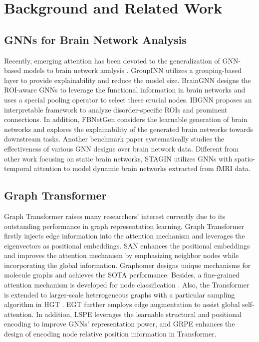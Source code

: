 \section{Background and Related Work}

\subsection{GNNs for Brain Network Analysis}
Recently, emerging attention has been devoted to the generalization of GNN-based models to brain network analysis \citep{DBLP:conf/miccai/LiDZZVD19, ahmedt2021graph}. GroupINN \citep{groupinn2019} utilizes a grouping-based layer to provide explainability and reduce the model size. BrainGNN \citep{li2020braingnn} designs the ROI-aware GNNs to leverage the functional information in brain networks and uses a special pooling operator to select these crucial nodes. IBGNN \citep{cui2022interpretable} proposes an interpretable framework to analyze disorder-specific ROIs and prominent connections. 
In addition, FBNetGen \citep{kan2022fbnetgen} considers the learnable generation of brain networks and explores the explainability of the generated brain networks towards downstream tasks. Another benchmark paper \citep{braingb} systematically studies the effectiveness of various GNN designs over brain network data. Different from other work focusing on static brain networks, STAGIN \citep{NEURIPS2021_22785dd2} utilizes GNNs with spatio-temporal attention to model dynamic brain networks extracted from fMRI data. 

\subsection{Graph Transformer}
Graph Transformer raises many researchers' interest currently due to its outstanding performance in graph representation learning. Graph Transformer \citep{graphtransformer_aaai} firstly injects edge information into the attention mechanism and leverages the eigenvectors as positional embeddings. SAN \citep{san} enhances the positional embeddings and improves the attention mechanism by emphasizing neighbor nodes while incorporating the global information. Graphomer \citep{graphormer} designs unique mechanisms for molecule graphs and achieves the SOTA performance. Besides, a fine-grained attention mechanism is developed for node classification \citep{jiananzhao}. Also, the Transformer is extended to larger-scale heterogeneous graphs with a particular sampling algorithm in HGT \citep{hu2020heterogeneous}. EGT \citep{hussain2021edge} further employs edge augmentation to assist global self-attention. In addition, LSPE \citep{dwivedi2022graph} leverages the learnable structural and positional encoding to improve GNNs' representation power, and GRPE \citep{https://doi.org/10.48550/arxiv.2201.12787} enhances the design of encoding node relative position information in Transformer. 
